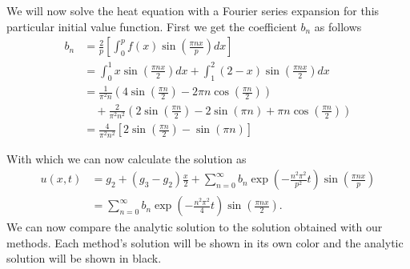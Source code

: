 \documentclass[00main.tex]{subfiles}
\begin{document}
We will now solve the heat equation with a Fourier series expansion for this particular initial value function. First we get the coefficient $b_n$ as follows \begin{align*}
b_n &= \frac{2}{p} \left[ \int_0^p f(x) \sin \left( \frac{\pi nx}{p}\right) dx \right]\\
&= \int_0^1 x \sin \left( \frac{\pi nx}{2}\right) dx + \int_1^2 (2-x) \sin \left( \frac{\pi nx}{2}\right) dx \\
 &= \frac{1}{\pi^2 n} \left(4 \sin \left(\frac{\pi n}{2} \right) -2\pi n \cos \left( \frac{\pi n}{2} \right) \right) \\ 
 & \quad + \frac{2}{\pi^2 n^2} \left( 2 \sin \left( \frac{\pi n}{2} \right) - 2 \sin \left( \pi n \right)  + \pi n \cos \left( \frac{\pi n}{2} \right) \right) \\
 &= \frac{4}{\pi^2 n^2} \left[ 2 \sin \left( \frac{\pi n}{2} \right) - \sin \left( \pi n \right) \right]
\end{align*}


With which we can now calculate the solution as \begin{align*}
u(x,t) &= g_2 + (g_3 - g_2) \frac{x}{2} + \sum_{n=0}^\infty b_n \exp \left( - \frac{n^2 \pi^2}{p^2} t \right) \sin \left( \frac{\pi nx}{p} \right) \\
&= \sum_{n=0}^\infty b_n \exp \left( - \frac{n^2 \pi^2}{4} t \right) \sin \left( \frac{\pi nx}{2} \right) .
\end{align*} We can now compare the analytic solution to the solution obtained with our methods. Each method's solution will be shown in its own color and the analytic solution will be shown in black.




\end{document}
